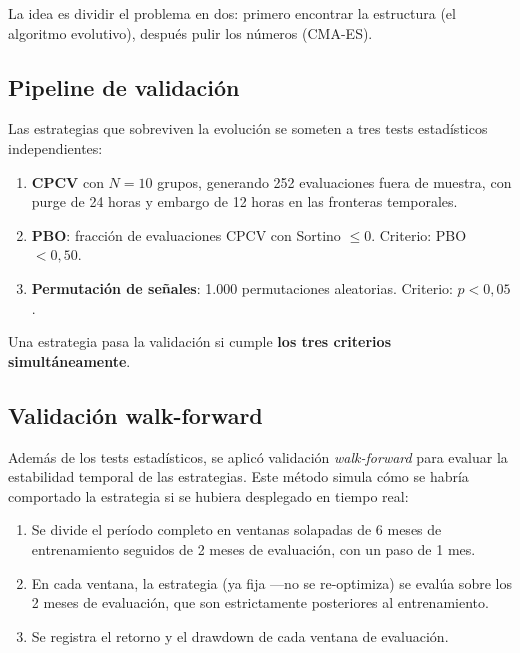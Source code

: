 \documentclass[12pt,a4paper]{article}
\begin{document}
La idea es dividir el problema en dos: primero encontrar la estructura (el algoritmo
evolutivo), después pulir los números (CMA-ES).

\subsection{Pipeline de validación}
\label{sec:validation}

Las estrategias que sobreviven la evolución se someten a tres tests estadísticos
independientes:

\begin{enumerate}
\item \textbf{CPCV} con $N = 10$ grupos, generando 252 evaluaciones fuera de muestra,
  con purge de 24 horas y embargo de 12 horas en las fronteras temporales.

\item \textbf{PBO}: fracción de evaluaciones CPCV con Sortino $\leq 0$.
  Criterio: PBO $< 0{,}50$.

\item \textbf{Permutación de señales}: 1.000 permutaciones aleatorias.
  Criterio: $p < 0{,}05$.
\end{enumerate}

Una estrategia pasa la validación si cumple \textbf{los tres criterios simultáneamente}.

\subsection{Validación walk-forward}
\label{sec:walkforward}

Además de los tests estadísticos, se aplicó validación \textit{walk-forward} para
evaluar la estabilidad temporal de las estrategias. Este método simula cómo se
habría comportado la estrategia si se hubiera desplegado en tiempo real:

\begin{enumerate}
\item Se divide el período completo en ventanas solapadas de 6 meses de
  entrenamiento seguidos de 2 meses de evaluación, con un paso de 1 mes.
\item En cada ventana, la estrategia (ya fija ---no se re-optimiza) se evalúa
  sobre los 2 meses de evaluación, que son estrictamente posteriores al
  entrenamiento.
\item Se registra el retorno y el drawdown de cada ventana de evaluación.
\end{enumerate}
\end{document}
